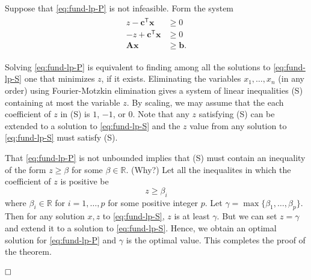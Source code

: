\documentclass[]{book}
\newcommand{\RR}{\mathbb{R}}
\newcommand{\T}{\mathsf{T}}
\newcommand{\mm}[1]{\mathbf{#1}}
\renewcommand{\vec}[1]{\mathbf{#1}}
\theoremstyle{definition}
\theoremstyle{definition}
\theoremstyle{remark}
\begin{document}
Suppose that \eqref{eq:fund-lp-P} is not infeasible. Form the system
\begin{align}
\begin{split}
z- \vec{c}^\T \vec{x} & \geq 0\\
-z+ \vec{c}^\T \vec{x} & \geq 0 \\
\mm{A}\vec{x} & \geq \vec{b}.
\end{split}
\label{eq:fund-lp-S}
\end{align}

Solving \eqref{eq:fund-lp-P} is equivalent to finding among all the
solutions to \eqref{eq:fund-lp-S} one that minimizes \(z\), if it exists.
Eliminating the variables \(x_1,\ldots,x_n\) (in any order) using
Fourier-Motzkin elimination gives a system of linear inequalities (S)
containing at most the variable \(z\). By scaling, we may assume that
the each coefficient of \(z\) in (S) is \(1\), \(-1\), or \(0\). Note
that any \(z\) satisfying (S) can be extended to a solution to
\eqref{eq:fund-lp-S} and the \(z\) value from any solution to
\eqref{eq:fund-lp-S} must satisfy (S).

That \eqref{eq:fund-lp-P} is not unbounded implies that (S) must contain
an inequality of the form \(z \geq \beta\) for some \(\beta \in \RR.\)
(Why?) Let all the inequalites in which the coefficient of \(z\) is
positive be \[z \geq \beta_i\] where \(\beta_i \in \RR\) for
\(i = 1,\ldots,p\) for some positive integer \(p\). Let
\(\gamma = \max\{\beta_1,\ldots,\beta_p\}\). Then for any solution
\(x,z\) to \eqref{eq:fund-lp-S}, \(z\) is at least \(\gamma\). But we can
set \(z = \gamma\) and extend it to a solution to \eqref{eq:fund-lp-S}.
Hence, we obtain an optimal solution for \eqref{eq:fund-lp-P} and
\(\gamma\) is the optimal value. This completes the proof of the
theorem.

\(\qed\)
\end{document}
